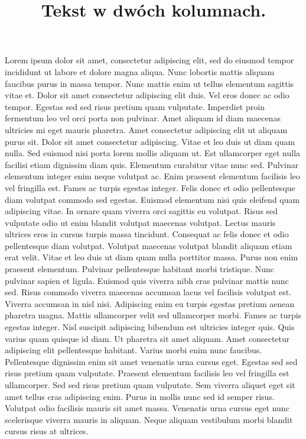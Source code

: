 ﻿\documentclass[11pt,a4paper,twocolumn]{article}         	%
\title{Tekst w dwóch kolumnach.}
\author{}                   		 	                    %
\date{}                                     		        %
\begin{document}
\maketitle

Lorem ipsum dolor sit amet, consectetur adipiscing elit, sed do eiusmod tempor incididunt ut labore et dolore magna aliqua. Nunc lobortis mattis aliquam faucibus purus in massa tempor. Nunc mattis enim ut tellus elementum sagittis vitae et. Dolor sit amet consectetur adipiscing elit duis. Vel eros donec ac odio tempor. Egestas sed sed risus pretium quam vulputate. Imperdiet proin fermentum leo vel orci porta non pulvinar. Amet aliquam id diam maecenas ultricies mi eget mauris pharetra. Amet consectetur adipiscing elit ut aliquam purus sit. Dolor sit amet consectetur adipiscing. Vitae et leo duis ut diam quam nulla. Sed euismod nisi porta lorem mollis aliquam ut. Est ullamcorper eget nulla facilisi etiam dignissim diam quis. Elementum curabitur vitae nunc sed. Pulvinar elementum integer enim neque volutpat ac. Enim praesent elementum facilisis leo vel fringilla est. Fames ac turpis egestas integer. Felis donec et odio pellentesque diam volutpat commodo sed egestas.
Euismod elementum nisi quis eleifend quam adipiscing vitae. In ornare quam viverra orci sagittis eu volutpat. Risus sed vulputate odio ut enim blandit volutpat maecenas volutpat. Lectus mauris ultrices eros in cursus turpis massa tincidunt. Consequat ac felis donec et odio pellentesque diam volutpat. Volutpat maecenas volutpat blandit aliquam etiam erat velit. Vitae et leo duis ut diam quam nulla porttitor massa. Purus non enim praesent elementum. Pulvinar pellentesque habitant morbi tristique. Nunc pulvinar sapien et ligula. Euismod quis viverra nibh cras pulvinar mattis nunc sed. Risus commodo viverra maecenas accumsan lacus vel facilisis volutpat est. Viverra accumsan in nisl nisi. Adipiscing enim eu turpis egestas pretium aenean pharetra magna. Mattis ullamcorper velit sed ullamcorper morbi. Fames ac turpis egestas integer.
Nisl suscipit adipiscing bibendum est ultricies integer quis. Quis varius quam quisque id diam. Ut pharetra sit amet aliquam. Amet consectetur adipiscing elit pellentesque habitant. Varius morbi enim nunc faucibus. Pellentesque dignissim enim sit amet venenatis urna cursus eget. Egestas sed sed risus pretium quam vulputate. Praesent elementum facilisis leo vel fringilla est ullamcorper. Sed sed risus pretium quam vulputate. Sem viverra aliquet eget sit amet tellus cras adipiscing enim. Purus in mollis nunc sed id semper risus. Volutpat odio facilisis mauris sit amet massa. Venenatis urna cursus eget nunc scelerisque viverra mauris in aliquam. Neque aliquam vestibulum morbi blandit cursus risus at ultrices.
\end{document}
